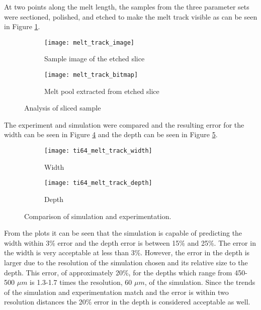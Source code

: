 At two points along the melt length, the samples from the three parameter sets were sectioned, polished, and etched to make the melt track visible as can be seen in Figure \ref{fig:melt_track_image}.  
\begin{figure}[!htb]
	\centering
		\begin{subfigure}{0.495\textwidth}
		\texttt{[image: melt\_track\_image]}
		\caption{Sample image of the etched slice}
		\label{fig:melt_track_image}
		\end{subfigure}
			\begin{subfigure}{0.495\textwidth}
			\texttt{[image: melt\_track\_bitmap]}
			\caption{Melt pool extracted from etched slice}
			\label{fig:melt_track_bitmap}
			\end{subfigure}
	\caption{Analysis of sliced sample}
	\label{fig:melt_track}
\end{figure}

The experiment and simulation were compared and the resulting error for the width can be seen in Figure \ref{fig:ti64_melt_track_width} and the depth can be seen in Figure \ref{fig:ti64_melt_track_depth}.
\begin{figure}[!htb]\centering
	\begin{subfigure}[c]{0.45\textwidth}\centering
	\texttt{[image: ti64\_melt\_track\_width]}
	\caption{Width}
	\label{fig:ti64_melt_track_width}
	\end{subfigure}\hfill{}
		\begin{subfigure}[c]{0.45\textwidth}\centering
		\texttt{[image: ti64\_melt\_track\_depth]}
		\caption{Depth}
		\label{fig:ti64_melt_track_depth}
		\end{subfigure}
	\caption{Comparison of simulation and experimentation.}
	\label{fig:ti64_melt_track}
\end{figure}
From the plots it can be seen that the simulation is capable of predicting the width within 3\% error and the depth error is between 15\% and 25\%.  The error in the width is very acceptable at less than 3\%.
However, the error in the depth is larger due to the resolution of the simulation chosen and its relative size to the depth.  This error, of approximately 20\%, for the depths which range from 450-500 $\mu m$ is 1.3-1.7 times the resolution, 60 $\mu m$, of the simulation.  Since the trends of the simulation and experimentation match and the error is within two resolution distances the 20\% error in the depth is considered acceptable as well. 
